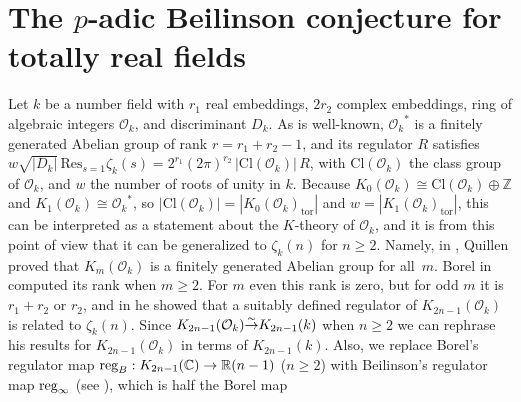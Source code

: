 \documentclass{amsart}
\begin{document}
\section{The {$p$-adic{\futurelet{}}} Beilinson conjecture for totally real fields}
\label{conjecturesection}

Let $ k $ be a number field with $ r_1 $ real embeddings, $ 2r_2 $ complex embeddings, 
ring of algebraic integers $ {{\mathcal O}_k} $, and discriminant $ D_k $.
As is well-known, $ {{\mathcal O}_k}^* $ is a finitely generated Abelian group
of rank $ r = r_1 + r_2 - 1 $, and its regulator $ R $ satisfies
$  w \sqrt{  |D_k| } \, \text{Res}_{s=1}\zeta_k(s) =  2^{ r_1 } (2\pi)^{ r_2 } \, |\text{Cl}({{\mathcal O}_k} )| \, R $,
with $ \text{Cl}({{\mathcal O}_k}) $ the class group of $ {{\mathcal O}_k} $, and $ w $ the number of roots of unity in $ k $.
Because  $ K_0({{\mathcal O}_k}) {\cong} \text{Cl}({{\mathcal O}_k}) \oplus {\mathbb Z} $ and $ K_1({{\mathcal O}_k}) {\cong} {{\mathcal O}_k}^* $, 
so $ |\text{Cl}({{\mathcal O}_k})| = |K_0({{\mathcal O}_k})_{\text{tor}}| $
and $ w = | K_1({{\mathcal O}_k})_{\text{tor}} | $, this can be interpreted
as a statement about the
$ K $-theory of $ {{\mathcal O}_k} $, and it is from this point of view that
it can be generalized to $ \zeta_k(n) $ for $ n \geq 2 $.
Namely, in \cite{qui73b}, Quillen proved that $ K_m({{\mathcal O}_k}) $ is a finitely generated Abelian group for all~$ m $.
Borel in \cite{Borel74} computed its rank when $ m \ge 2 $.  For $ m $ even this rank is zero,
but for odd $ m $ it is $ r_1+r_2 $ or $ r_2 $, and in \cite{Borel77}
he showed that a suitably defined regulator of $ K_{2n-1}({{\mathcal O}_k}) $ is related to $ \zeta_k(n) $.
Since $ K_{2n-1}({{\mathcal O}_k}) {\buildrel{\sim}\over{\rightarrow}} K_{2n-1}(k) $ when $ n \ge 2 $
we can rephrase his results for $ K_{2n-1}({{\mathcal O}_k}) $ in terms of $ K_{2n-1}(k) $.
Also, we replace Borel's  regulator map $ {\textup{reg}}_B : K_{2n-1}({\mathbb C}) \to {\mathbb R}(n-1) $ ($ n \ge 2 $)
with Beilinson's regulator map $ {\textup{reg}}_\infty $ (see \cite[\S~4]{schn88}), which is half the Borel map
\end{document}
